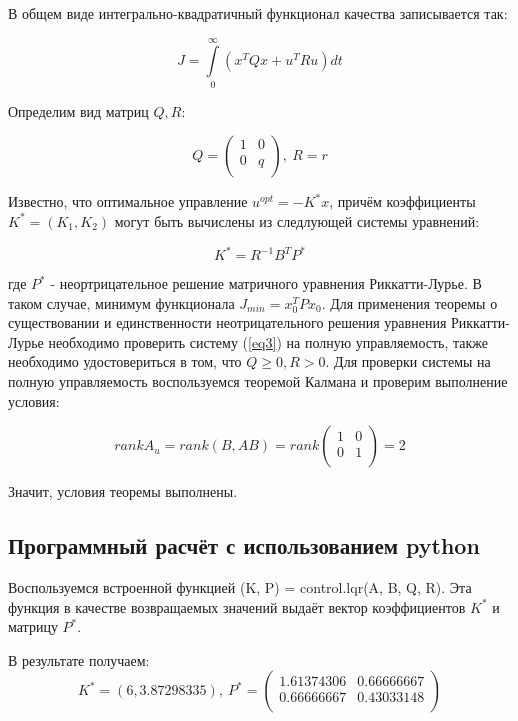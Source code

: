 \documentclass[12pt]{article}
\begin{document}
В общем виде интегрально-квадратичный функционал качества записывается так:

\begin{equation}
 J = \int\limits_{0}^{\infty} (x^TQx + u^TRu)dt
\end{equation}

Определим вид матриц $Q, R$:

\begin{equation}
 Q = 
 \begin{pmatrix}
  1 & 0\\
  0 & q \\
 \end{pmatrix}
 , \ R = r
\end{equation}

Известно, что оптимальное управление $u^{opt} = -K^*x$, причём коэффициенты $K^* = (K_1, K_2)$ могут быть вычислены из следлующей системы уравнений:

\begin{equation}
 K^* = R^{-1}B^TP^*
\end{equation}

где $P^*$ - неортрицательное решение матричного уравнения Риккатти-Лурье. В таком случае, минимум функционала $J_{min} = x_0^TPx_0$.
Для применения теоремы о существовании и единственности неотрицательного решения уравнения Риккатти-Лурье необходимо проверить систему (\ref{eq3}) на полную управляемость, также необходимо удостовериться в том, что $Q \geq 0, R > 0$. Для проверки системы на полную управляемость воспользуемся теоремой Калмана и проверим выполнение условия:

\begin{equation}
 rankA_u = rank(B, AB) = rank
 \begin{pmatrix}
  1 & 0 \\
  0 & 1 \\
 \end{pmatrix}
 = 2
\end{equation}

Значит, условия теоремы выполнены.

\subsection{Программный расчёт с использованием python}

Воспользуемся встроенной функцией (K, P) = control.lqr(A, B, Q, R). Эта функция в качестве возвращаемых значений выдаёт вектор коэффициентов $K^*$ и матрицу $P^*$.

В результате получаем:
\begin{equation}
 K^* = (6, 3.87298335), \
 P^* = 
 \begin{pmatrix}
  1.61374306 & 0.66666667 \\
  0.66666667 & 0.43033148 \\
 \end{pmatrix}
\end{equation}
\end{document}
